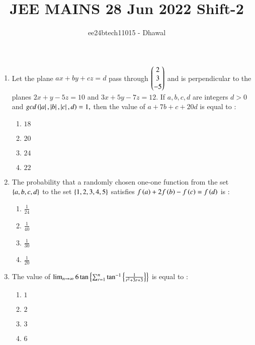 \documentclass[journal]{IEEEtran}
\theoremstyle{remark}
\begin{document}

\onecolumn

\title{JEE MAINS 28 Jun 2022 Shift-2}
\author{ee24btech11015 - Dhawal}
\maketitle

\renewcommand{\thefigure}{\theenumi}
\renewcommand{\thetable}{\theenumi}

\begin{enumerate}[start=11]
	\item Let the plane $ax + by + cz = d$ pass through $\begin{pmatrix}2\\ 3\\ -5\end{pmatrix}$ and is perpendicular to the planes $2x + y - 5z = 10$ and $3x + 5y - 7z = 12.$ If $a, b, c, d$ are integers $d > 0$ and $gcd \left(\left\vert a\right\vert, \left\vert b\right\vert, \left\vert c\right\vert, d\right) = 1,$ then the value of $a + 7b + c + 20d$ is equal to :

\begin{multicols}{4}
\begin{enumerate}
\item $18$
\item $20$
\item $24$
\item $22$
\end{enumerate}
\end{multicols}

\item  The probability that a randomly chosen one-one function from the set $\left\{a, b, c, d\right\}$ to the set $\left\{1, 2, 3, 4, 5\right\}$ satisfies $f\left(a\right) + 2f\left(b\right) - f\left(c\right) = f\left(d\right)$ is :

\begin{multicols}{4}
\begin{enumerate}
\item $\frac{1}{24}$
\item $\frac{1}{40}$
\item $\frac{1}{30}$
\item $\frac{1}{20}$
\end{enumerate}
\end{multicols}

\item  The value of $ \lim_{n \to \infty} 6 \tan \left\{ \sum_{r=1}^{n} \tan^{-1} \left\{ \frac{1}{r^2 + 3r + 3} \right\}\right\}$
is equal to :

\begin{multicols}{4}
\begin{enumerate}
\item $1$
\item $2$
\item $3$
\item $6$
\end{enumerate}
\end{multicols}


\end{enumerate}
\end{document}

